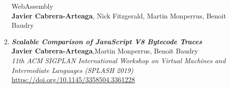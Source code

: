 \begin{enumerate}[I]
{{    WebAssembly}} \\
        \textbf{Javier Cabrera-Arteaga}, Nick Fitzgerald, Martin Monperrus, Benoit Baudry\\
    \item \textbf{\textit{Scalable Comparison of JavaScript V8 Bytecode Traces}} \\
        \textbf{Javier Cabrera-Arteaga},Martin Monperrus, Benoit Baudry\\
        \textit{11th ACM SIGPLAN International Workshop on Virtual Machines and Intermediate Languages (SPLASH 2019)} \\
        \url{https://doi.org/10.1145/3358504.3361228}
\end{enumerate}


